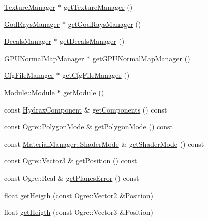 \begin{CompactItemize}
\item 
\hyperlink{class_hydrax_1_1_texture_manager}{TextureManager} $\ast$ \hyperlink{class_hydrax_1_1_hydrax_d2f92d6e7d0feabcd66d405a7c8d8bc8}{getTextureManager} ()
\item 
\hyperlink{class_hydrax_1_1_god_rays_manager}{GodRaysManager} $\ast$ \hyperlink{class_hydrax_1_1_hydrax_50fd9a0cdeb608f8048713dffffe9c55}{getGodRaysManager} ()
\item 
\hyperlink{class_hydrax_1_1_decals_manager}{DecalsManager} $\ast$ \hyperlink{class_hydrax_1_1_hydrax_0ed95597b4ad5e33f2ba7f82f3ac4083}{getDecalsManager} ()
\item 
\hyperlink{class_hydrax_1_1_g_p_u_normal_map_manager}{GPUNormalMapManager} $\ast$ \hyperlink{class_hydrax_1_1_hydrax_38e4600d83e382515265b70e0dcde4d2}{getGPUNormalMapManager} ()
\item 
\hyperlink{class_hydrax_1_1_cfg_file_manager}{CfgFileManager} $\ast$ \hyperlink{class_hydrax_1_1_hydrax_5ac35cd3073a581415afb95bef7e7180}{getCfgFileManager} ()
\item 
\hyperlink{class_hydrax_1_1_module_1_1_module}{Module::Module} $\ast$ \hyperlink{class_hydrax_1_1_hydrax_9ebb3dbda04c58af5affc4156277d681}{getModule} ()
\item 
const \hyperlink{namespace_hydrax_e8e15abf83a51b0cf514c7d1a133650a}{HydraxComponent} \& \hyperlink{class_hydrax_1_1_hydrax_af3b15b5c19cd07a6a95c40ee9b3247d}{getComponents} () const 
\item 
const Ogre::PolygonMode \& \hyperlink{class_hydrax_1_1_hydrax_f31388148136dfdd563388e3f4ae4b59}{getPolygonMode} () const 
\item 
const \hyperlink{class_hydrax_1_1_material_manager_cb13fe494b6960a96270e1ac293c48fb}{MaterialManager::ShaderMode} \& \hyperlink{class_hydrax_1_1_hydrax_a3ca4b94a8cfb1aed6e3a997dc9fac7e}{getShaderMode} () const 
\item 
const Ogre::Vector3 \& \hyperlink{class_hydrax_1_1_hydrax_011da649ae072cce9c6db28620b67a42}{getPosition} () const 
\item 
const Ogre::Real \& \hyperlink{class_hydrax_1_1_hydrax_99b530dca1b0ba95e43d4deeec01d7d1}{getPlanesError} () const 
\item 
float \hyperlink{class_hydrax_1_1_hydrax_bbfe63c58bc4f56ad625872b19b51a60}{getHeigth} (const Ogre::Vector2 \&Position)
\item 
float \hyperlink{class_hydrax_1_1_hydrax_29fbd3e931c36ef924c38cbe329a4be7}{getHeigth} (const Ogre::Vector3 \&Position)
\item 

\end{CompactItemize}
